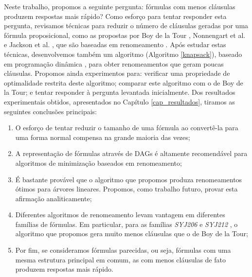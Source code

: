 
\label{cap_conclusao}

\indent

Neste trabalho, propomos a seguinte pergunta: fórmulas com menos cláusulas produzem respostas mais rápido? Como esforço para tentar responder esta pergunta, revisamos técnicas para reduzir o número de cláusulas geradas por uma fórmula proposicional, como as propostas por Boy de la Tour \cite{de1992optimality}, Nonnengart et al. \cite{nonnengart2001computing} e Jackson et al. \cite{jackson2004clause}, que são baseadas em renomeamento \cite{plaisted1986structure}. Após estudar estas técnicas, desenvolvemos também um algoritmo (Algoritmo \ref{knapsack}), baseado em programação dinâmica \cite{bellman2015applied}, para obter renomeamentos que geram poucas cláusulas. Propomos ainda experimentos para: verificar uma propriedade de optimalidade restrita deste algoritmo; comparar este algoritmo com o de Boy de la Tour; e tentar responder à pergunta levantada inicialmente. Dos resultados experimentais obtidos, apresentados no Capítulo \ref{cap_resultados}, tiramos as seguintes conclusões principais:
\begin{enumerate}
	\item O esforço de tentar reduzir o tamanho de uma fórmula ao convertê-la para uma forma normal compensa na grande maioria das vezes;
	\item A representação de fórmulas através de DAGs é altamente recomendável para algoritmos de minimização baseados em renomeamento;
	\item É bastante provável que o algoritmo que propomos produza renomeamentos ótimos para árvores lineares. Propomos, como trabalho futuro, provar esta afirmação analiticamente;
	\item Diferentes algoritmos de renomeamento levam vantagem em diferentes famílias de fórmulas. Em particular, para as famílias \emph{SYJ206} e \emph{SYJ212} \cite{raths07jar}, o algoritmo que propomos gera muito menos cláusulas que o de Boy de la Tour;
	\item Por fim, se consideramos fórmulas parecidas, ou seja, fórmulas com uma mesma estrutura principal em comum, as com menos cláusulas de fato produzem respostas mais rápido.
\end{enumerate}

